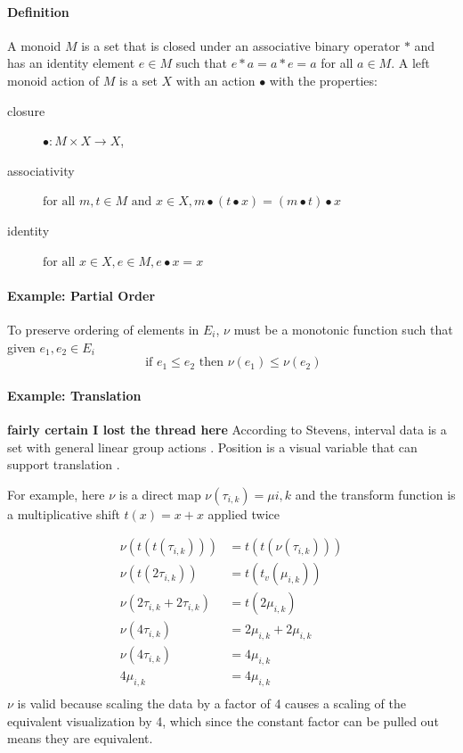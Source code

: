 \documentclass[../main.tex]{subfiles}
\begin{document}
\paragraph{Definition}
A monoid\cite{Monoid2021} $M$ is a set that is closed under an associative binary operator $\ast$ and has an identity element $e\in M$ such that $e\ast a= a \ast e = a$ for all $a \in M$.  A left monoid action \cite{SemigroupAction2021,ActionNLab} of $M$ is a set $X$ with an action $\bullet$ with the properties:
\begin{description}
    \item[closure] $\bullet: M\times X \rightarrow X$,
    \item[associativity] $\text{for all } m,t \in M \text{ and } x\in X, m\bullet(t\bullet x) = (m\bullet t) \bullet x$
    \item[identity] $\text{for all } x\in X, e\in M,  e\bullet x = x$ 
\end{description} 

\paragraph{Example: Partial Order}
To preserve ordering of elements in $E_i$, $\nu$ must be a monotonic function such that given $e_1, e_2 \in E_{i}$
\begin{equation}
\text{ if } e_1 \leq e_2 \text{ then } \nu(e_1) \leq \nu(e_2)
\end{equation}

\paragraph{Example: Translation}
\textbf{fairly certain I lost the thread here}
According to Stevens, interval data is a set with general linear group actions \cite{stevensTheoryScalesMeasurement1946,leaFormalizationMeasurementScale}. Position is a visual variable that can support translation \cite{bertinIIPropertiesGraphic2011,krygierMakingMapsVisual2005,munznerMarksChannels}. 

For example, here $\nu$ is a direct map $\nu(\tau_{i,k}) = \mu{i,k}$ and the transform function is a multiplicative shift $t(x) = x + x$ applied twice 

\begin{align}
    \nu(t(t(\tau_{i,k}))) &= t(t(\nu(\tau_{i,k})))\\
    \nu(t(2\tau_{i,k})) &= t(t_v(\mu_{i,k}))\\
    \nu(2\tau_{i,k} + 2\tau_{i,k}) &= t(2\mu_{i,k})\\
    \nu(4\tau_{i,k}) &= 2\mu_{i,k} + 2\mu_{i,k} \\
    \nu(4\tau_{i,k})&=4\mu_{i,k}\\
    4\mu_{i,k}&=4\mu_{i,k}\\
\end{align}
$\nu$ is valid because scaling the data by a factor of 4 causes a scaling of the equivalent visualization by 4, which since the constant factor can be pulled out means they are equivalent. 
\end{document}
